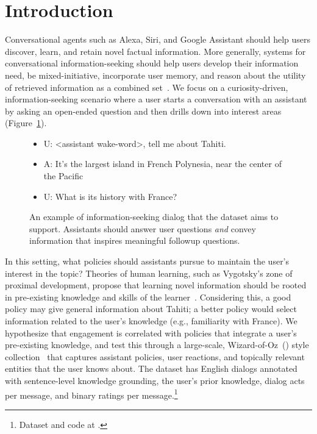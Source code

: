 \section{Introduction}
\label{sec:intro}

Conversational agents such as Alexa, Siri, and Google Assistant should help users discover, learn, and retain novel factual information.
More generally, systems for conversational information-seeking should help users develop their information need, be mixed-initiative, incorporate user memory, and reason about the utility of retrieved information as a combined set~\citep{Radlinski2017ATF}.
We focus on a curiosity-driven, information-seeking scenario where a user starts a conversation with an assistant by asking an open-ended question and then drills down into interest areas (Figure~\ref{fig:example}).
\begin{figure}[t]
\centering
\begingroup
\addtolength\leftmargini{-5mm}
\begin{itemize}
    \setlength\itemsep{-1.25mm}
          \it
          \fontsize{10}{12}\selectfont
    \item[] U: <assistant wake-word>, tell me about Tahiti.
    \item[] A: It's the largest island in French Polynesia, near the center of the Pacific
    \item[] U: What is its history with France?
\end{itemize}
\endgroup
\caption{
    An example of information-seeking dialog that the \rover{} dataset aims to support.
    Assistants should answer user questions \emph{and} convey information that inspires meaningful followup questions.
}
\label{fig:example}
\end{figure}

In this setting, what policies should assistants pursue to maintain the user's interest in the topic?
Theories of human learning, such as Vygotsky's zone of proximal development, propose that learning novel information should be rooted in pre-existing knowledge and skills of the learner~\citep{chaiklin-03}.
Considering this, a good policy may give general information about Tahiti; a better policy would select information related to the user's knowledge (e.g., familiarity with France).
We hypothesize that engagement is correlated with policies that integrate a user's pre-existing knowledge, and test this through a large-scale, Wizard-of-Oz~(\woz{}) style collection~\citep{Kelley1984AnID,Wen2016ANE} that captures assistant policies, user reactions, and topically relevant entities that the user knows about.
The \rover{} dataset has \ndialogsfull{} English dialogs annotated with sentence-level knowledge grounding, the user's prior knowledge, dialog acts per message, and binary ratings per message.\footnote{
    Dataset and code at \dsurl{}.
}

